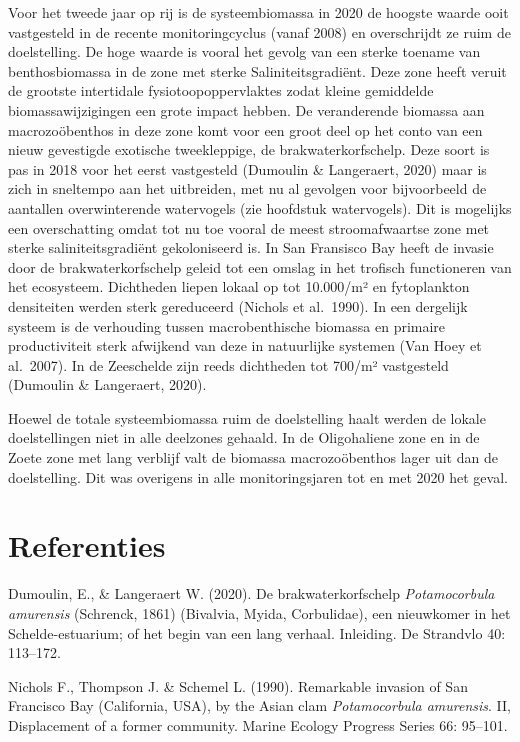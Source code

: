 \documentclass[twoside]{extreport}
\begin{document}
Voor het tweede jaar op rij is de systeembiomassa in 2020 de hoogste
waarde ooit vastgesteld in de recente monitoringcyclus (vanaf 2008) en
overschrijdt ze ruim de doelstelling. De hoge waarde is vooral het
gevolg van een sterke toename van benthosbiomassa in de zone met sterke
Saliniteitsgradiënt. Deze zone heeft veruit de grootste intertidale
fysiotoopoppervlaktes zodat kleine gemiddelde biomassawijzigingen een
grote impact hebben. De veranderende biomassa aan macrozoöbenthos in
deze zone komt voor een groot deel op het conto van een nieuw gevestigde
exotische tweekleppige, de brakwaterkorfschelp. Deze soort is pas in
2018 voor het eerst vastgesteld (Dumoulin \& Langeraert, 2020) maar is
zich in sneltempo aan het uitbreiden, met nu al gevolgen voor
bijvoorbeeld de aantallen overwinterende watervogels (zie hoofdstuk
watervogels). Dit is mogelijks een overschatting omdat tot nu toe vooral
de meest stroomafwaartse zone met sterke saliniteitsgradiënt
gekoloniseerd is. In San Fransisco Bay heeft de invasie door de
brakwaterkorfschelp geleid tot een omslag in het trofisch functioneren
van het ecosysteem. Dichtheden liepen lokaal op tot 10.000/m² en
fytoplankton densiteiten werden sterk gereduceerd (Nichols et al.~1990).
In een dergelijk systeem is de verhouding tussen macrobenthische
biomassa en primaire productiviteit sterk afwijkend van deze in
natuurlijke systemen (Van Hoey et al.~2007). In de Zeeschelde zijn reeds
dichtheden tot 700/m² vastgesteld (Dumoulin \& Langeraert, 2020).

Hoewel de totale systeembiomassa ruim de doelstelling haalt werden de
lokale doelstellingen niet in alle deelzones gehaald. In de Oligohaliene
zone en in de Zoete zone met lang verblijf valt de biomassa
macrozoöbenthos lager uit dan de doelstelling. Dit was overigens in alle
monitoringsjaren tot en met 2020 het geval.

\hypertarget{referenties}{%
\section{Referenties}\label{referenties}}

Dumoulin, E., \& Langeraert W. (2020). De brakwaterkorfschelp
\emph{Potamocorbula amurensis} (Schrenck, 1861) (Bivalvia, Myida,
Corbulidae), een nieuwkomer in het Schelde-estuarium; of het begin van
een lang verhaal. Inleiding. De Strandvlo 40: 113--172.

Nichols F., Thompson J. \& Schemel L. (1990). Remarkable invasion of San
Francisco Bay (California, USA), by the Asian clam \emph{Potamocorbula
amurensis}. II, Displacement of a former community. Marine Ecology
Progress Series 66: 95--101.
\end{document}
